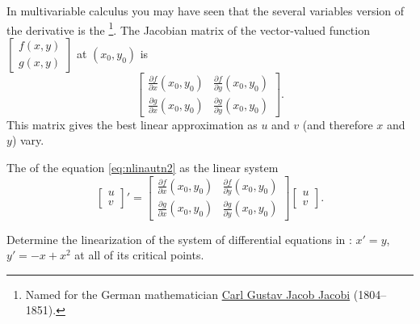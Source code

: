In multivariable calculus you may
have seen that the several variables version of the derivative is the
\emph{}%
\footnote{Named for the German mathematician
\href{https://en.wikipedia.org/wiki/Carl_Gustav_Jacob_Jacobi}{Carl Gustav Jacob Jacobi}
(1804--1851).}.   The Jacobian matrix of 
the vector-valued function
$\left[ \begin{smallmatrix} f(x,y) \\ g(x,y) \end{smallmatrix} \right]$
at $(x_0,y_0)$ is 
\begin{equation*}
\begin{bmatrix}
\frac{\partial f}{\partial x}(x_0,y_0) &
\frac{\partial f}{\partial y}(x_0,y_0) \\
\frac{\partial g}{\partial x}(x_0,y_0) &
\frac{\partial g}{\partial y}(x_0,y_0)
\end{bmatrix} .
\end{equation*}
This matrix gives the best linear approximation as $u$ and $v$ (and
therefore $x$ and $y$) vary.  

\begin{definition}
The \emph{} of the equation
\eqref{eq:nlinautn2} as the linear system
\begin{equation*}
\begin{bmatrix} u \\ v \end{bmatrix} ' =
\begin{bmatrix}
\frac{\partial f}{\partial x}(x_0,y_0) &
\frac{\partial f}{\partial y}(x_0,y_0) \\
\frac{\partial g}{\partial x}(x_0,y_0) &
\frac{\partial g}{\partial y}(x_0,y_0)
\end{bmatrix} 
\begin{bmatrix} u \\ v \end{bmatrix} .
\end{equation*}
\end{definition}

\begin{example} \label{example:nlin-1b-examplelin}
Determine the linearization of the system of differential equations in :
$x' = y$, $y' = -x+x^2$ at all of its critical points.
\end{example}

